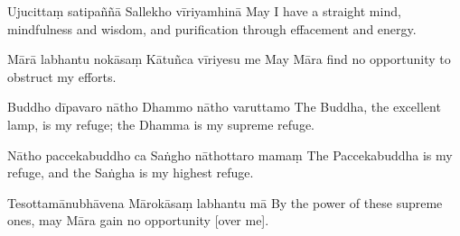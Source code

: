 \begin{chantsubsection}
  \chantlinepair
    {Ujucittaṃ satipaññā}
    {Sallekho vīriyamhinā}
    {May I have a straight mind, mindfulness and wisdom, and purification through effacement and energy.}

  \chantlinepair
    {Mārā labhantu nokāsaṃ}
    {Kātuñca vīriyesu me}
    {May Māra find no opportunity to obstruct my efforts.}

  \chantlinepair
    {Buddho dīpavaro nātho}
    {Dhammo nātho varuttamo}
    {The Buddha, the excellent lamp, is my refuge; the Dhamma is my supreme refuge.}

  \chantlinepair
    {Nātho paccekabuddho ca}
    {Saṅgho nāthottaro mamaṃ}
    {The Paccekabuddha is my refuge, and the Saṅgha is my highest refuge.}

  \chantlinepair
    {Tesottamānubhāvena}
    {Mārokāsaṃ labhantu mā}
    {By the power of these supreme ones, may Māra gain no opportunity [over me].}
\end{chantsubsection}
